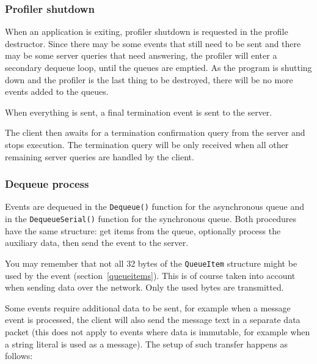 \documentclass[hidelinks,titlepage,a4paper]{article}
\begin{document}
\subsubsection{Profiler shutdown}
\label{shutdown}

When an application is exiting, profiler shutdown is requested in the profile destructor. Since there may be some events that still need to be sent and there may be some server queries that need answering, the profiler will enter a secondary dequeue loop, until the queues are emptied. As the program is shutting down and the profiler is the last thing to be destroyed, there will be no more events added to the queues.

When everything is sent, a final termination event is sent to the server.

The client then awaits for a termination confirmation query from the server and stops execution. The termination query will be only received when all other remaining server queries are handled by the client.

\subsubsection{Dequeue process}
\label{dequeue}

Events are dequeued in the \texttt{Dequeue()} function for the asynchronous queue and in the \texttt{DequeueSerial()} function for the synchronous queue. Both procedures have the same structure: get items from the queue, optionally process the auxiliary data, then send the event to the server.

You may remember that not all 32 bytes of the \texttt{QueueItem} structure might be used by the event (section~\ref{queueitems}). This is of course taken into account when sending data over the network. Only the used bytes are transmitted.

Some events require additional data to be sent, for example when a message event is processed, the client will also send the message text in a separate data packet (this does not apply to events where data is immutable, for example when a string literal is used as a message). The setup of such transfer happens as follows:
\end{document}
